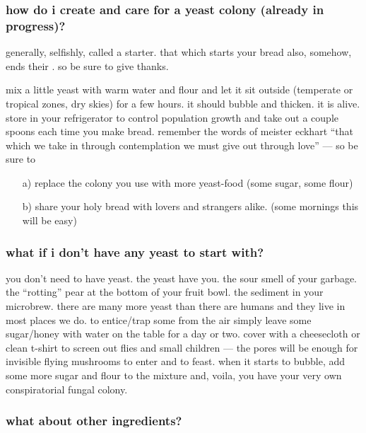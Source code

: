\subsubsection{how do i create and care for a yeast colony (already in progress)?}

generally, selfishly, called a starter. that which starts your bread
also, somehow, ends their . so be sure to give thanks.

mix a little yeast with warm water and flour and let it sit outside
(temperate or tropical zones, dry skies) for a few hours. it should
bubble and thicken. it is alive. store in your refrigerator to control
population growth and take out a couple spoons each time you make
bread. remember the words of meister eckhart ``that which we take in
through contemplation we must give out through love'' --- so be
sure to

\begin{enumerate}
  \item[a)] replace the colony you use with more yeast-food (some sugar,
  some flour)

  \item[b)] share your holy bread with lovers and strangers alike. (some
  mornings this will be easy)
\end{enumerate}

\subsubsection{what if i don't have any yeast to start with?}

you don't need to have yeast. the yeast have you. the sour smell of
your garbage. the ``rotting'' pear at the bottom of your fruit
bowl. the sediment in your microbrew. there are many more yeast than
there are humans and they live in most places we do. to entice/trap
some from the air simply leave some sugar/honey with water on the
table for a day or two. cover with a cheesecloth or clean t-shirt to
screen out flies and small children --- the pores will be enough for
invisible flying mushrooms to enter and to feast. when it starts to
bubble, add some more sugar and flour to the mixture and, voila, you
have your very own conspiratorial fungal colony.

\subsubsection{what about other ingredients?}

